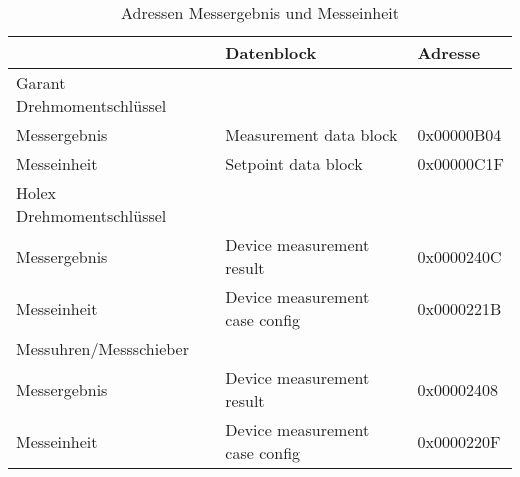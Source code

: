\begin{table}[H]
	\centering
	\begin{tabular}[H]{l|l|l}
		 & Datenblock & Adresse \\
		\hline
		Garant Drehmomentschlüssel & & \\
		Messergebnis & Measurement data block & 0x00000B04 \\
		Messeinheit & Setpoint data block & 0x00000C1F \\
		\hline
		Holex Drehmomentschlüssel & & \\
		Messergebnis & Device measurement result & 0x0000240C \\
		Messeinheit & Device measurement case config & 0x0000221B \\
		\hline
		Messuhren/Messschieber & & \\
		Messergebnis & Device measurement result & 0x00002408 \\
		Messeinheit & Device measurement case config & 0x0000220F \\
		
	\end{tabular}
	\caption{Adressen Messergebnis und Messeinheit}
\end{table}

